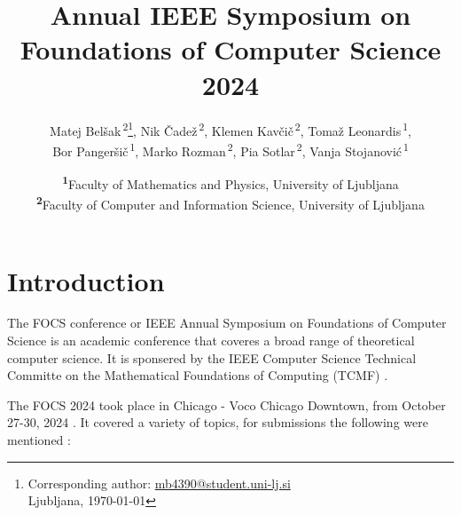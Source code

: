 \documentclass[
	a4paper, %
	10pt, %
	unnumberedsections, %
	twoside, %
]{LTJournalArticle}
\title{Annual IEEE Symposium on Foundations of Computer Science 2024} %
\author{%
	Matej Bel\v sak\textsuperscript{\,2}\thanks{Corresponding author: \href{mailto:mb4390@student.uni-lj.si}{mb4390@student.uni-lj.si}\\ Ljubljana, \monthyeardate\today  }, 
	Nik \v Cade\v z\textsuperscript{\,2},
	Klemen Kav\v ci\v c\textsuperscript{\,2}, 
	Toma\v z Leonardis\textsuperscript{\,1},\\
	Bor Panger\v si\v c\textsuperscript{\,1}, 
	Marko Rozman\textsuperscript{\,2}, 
	Pia Sotlar\textsuperscript{\,2}, 
	Vanja Stojanovi\' c\textsuperscript{\,1}
}
\date{
	\footnotesize\textsuperscript{\textbf{1}}Faculty of Mathematics and Physics, University of Ljubljana\\
	\textsuperscript{\textbf{2}}Faculty of Computer and Information Science, University of Ljubljana
}
\begin{document}
\maketitle %


\section{Introduction}

The FOCS conference or IEEE Annual Symposium on Foundations of Computer Science is an academic conference that coveres
a broad range of theoretical computer science. It is sponsered by the IEEE Computer Science Technical Committe on the 
Mathematical Foundations of Computing (TCMF) \cite{ieeefocs}.

The FOCS 2024 took place in Chicago - Voco Chicago Downtown, from October 27-30, 2024 \cite{focs2024}. It covered a variety of topics, for submissions
the following were mentioned \cite{focs2024}:
\end{document}
